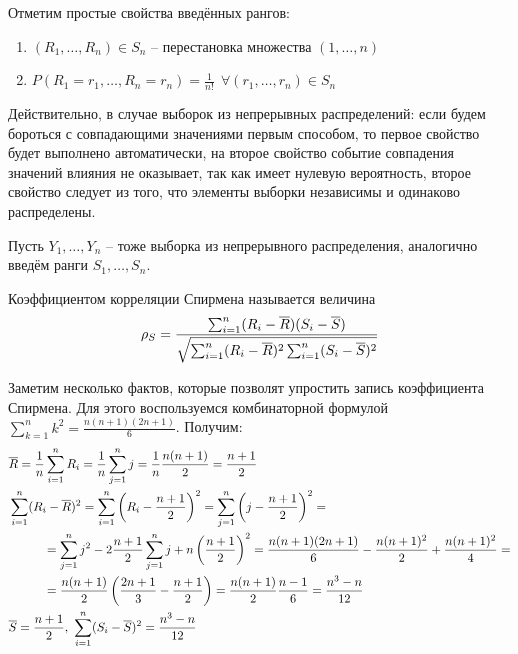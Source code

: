\begin{note}
    Отметим простые свойства введённых рангов:
    \begin{enumerate}
        \item $(R_1, \dots, R_n) \in S_n$ -- перестановка множества $(1, \dots, n)$
        \item $P(R_1 = r_1, \dots, R_n = r_n) = \frac{1}{n!} \ \ \forall (r_1, \dots, r_n) \in S_n$
    \end{enumerate}
    Действительно, в случае выборок из непрерывных распределений: если будем бороться с совпадающими значениями первым способом, то первое свойство будет выполнено автоматически, на второе свойство событие совпадения значений влияния не оказывает, так как имеет нулевую вероятность, второе свойство следует из того, что элементы выборки независимы и одинаково распределены.
\end{note}

\begin{note}
    Пусть $Y_1, \dots, Y_n$ -- тоже выборка из непрерывного распределения, аналогично введём ранги $S_1, \dots, S_n$.
\end{note}

\begin{definition}
    Коэффициентом корреляции Спирмена называется величина
    \[
        \rho_S = \frac{\sum_{i=1}^n (R_i - \overline{R})(S_i-\overline{S})}{\sqrt{\sum_{i=1}^n (R_i-\overline{R})^2 \sum_{i=1}^n (S_i-\overline{S})^2}}
    \]
\end{definition}

\begin{note}
    Заметим несколько фактов, которые позволят упростить запись коэффициента Спирмена. Для этого воспользуемся комбинаторной формулой $\sum_{k=1}^n k^2 = \frac{n(n+1)(2n+1)}{6}$. Получим:
    \begin{align*}
        & \overline{R} = \frac{1}{n} \sum_{i=1}^n R_i = \frac{1}{n} \sum_{j=1}^n j = \frac{1}{n} \frac{n(n+1)}{2} = \frac{n+1}{2}
        \\
        & \sum_{i=1}^n (R_i-\overline{R})^2 = \sum_{i=1}^n \left(R_i-\frac{n+1}{2}\right)^2 = \sum_{j=1}^n \left(j-\frac{n+1}{2}\right)^2 =
        \\
        & \hspace{1cm} = \sum_{j=1}^n j^2 - 2 \frac{n+1}{2} \sum_{j=1}^n j + n \left(\frac{n+1}{2}\right)^2 = \frac{n(n+1)(2n+1)}{6} - \frac{n(n+1)^2}{2} + \frac{n(n+1)^2}{4} =
        \\
        & \hspace{1cm} = \frac{n(n+1)}{2} \left(\frac{2n+1}{3} - \frac{n+1}{2}\right) = \frac{n(n+1)}{2} \frac{n-1}{6} = \frac{n^3-n}{12}
        \\
        & \overline{S} = \frac{n+1}{2},\ \sum_{i=1}^n (S_i-\overline{S})^2 = \frac{n^3-n}{12}
    \end{align*}
\end{note}

